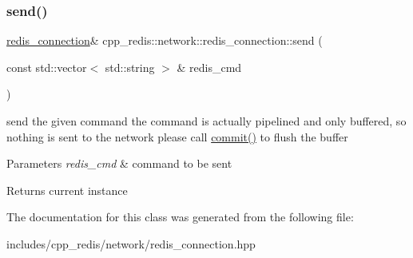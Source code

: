 \subsubsection{\texorpdfstring{send()}{send()}}
{\footnotesize\ttfamily \mbox{\hyperlink{classcpp__redis_1_1network_1_1redis__connection}{redis\+\_\+connection}}\& cpp\+\_\+redis\+::network\+::redis\+\_\+connection\+::send (\begin{DoxyParamCaption}\item[{const std\+::vector$<$ std\+::string $>$ \&}]{redis\+\_\+cmd }\end{DoxyParamCaption})}

send the given command the command is actually pipelined and only buffered, so nothing is sent to the network please call \mbox{\hyperlink{classcpp__redis_1_1network_1_1redis__connection_a8e6980d40139877c16e995051b780d60}{commit()}} to flush the buffer


\begin{DoxyParams}{Parameters}
{\em redis\+\_\+cmd} & command to be sent \\
\hline
\end{DoxyParams}
\begin{DoxyReturn}{Returns}
current instance 
\end{DoxyReturn}


The documentation for this class was generated from the following file\+:\begin{DoxyCompactItemize}
\item 
includes/cpp\+\_\+redis/network/redis\+\_\+connection.\+hpp\end{DoxyCompactItemize}
